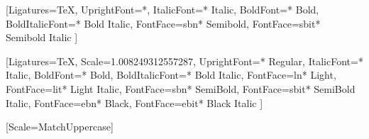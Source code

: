 \usepackage[margin=0.75in]{geometry}

\usepackage{fontspec}
\setmainfont{Arno Pro}
  [Ligatures=TeX,
   UprightFont=*,
   ItalicFont={* Italic},
   BoldFont={* Bold},
   BoldItalicFont={* Bold Italic},
   FontFace={sb}{n}{* Semibold},
   FontFace={sb}{it}{* Semibold Italic}
   ]
\DeclareRobustCommand{\sbseries}{\fontseries{sb}\selectfont}
\DeclareTextFontCommand{\textsb}{\sbseries}

\setsansfont{Source Sans Pro}
  [Ligatures=TeX,
   Scale=1.008249312557287,
   UprightFont={* Regular},
   ItalicFont={* Italic},
   BoldFont={* Bold},
   BoldItalicFont={* Bold Italic},
   FontFace={l}{n}{* Light},
   FontFace={l}{it}{* Light Italic},
   FontFace={sb}{n}{* SemiBold},
   FontFace={sb}{it}{* SemiBold Italic},
   FontFace={eb}{n}{* Black},
   FontFace={eb}{it}{* Black Italic}
  ]
\DeclareRobustCommand{\ltseries}{\fontseries{l}\selectfont}
\DeclareTextFontCommand{\textlt}{\ltseries}
\DeclareRobustCommand{\ebseries}{\fontseries{eb}\selectfont}
\DeclareTextFontCommand{\texteb}{\ebseries}

\setmonofont{IBM Plex Mono Regular}[Scale=MatchUppercase]

\usepackage[dvipsnames]{xcolor}

\usepackage{titling}
\pretitle{\begin{center}\Large\sffamily\bfseries\color{themecolour}}
\posttitle{\par\end{center}\vspace{20ex}}
\preauthor{\begin{center}\vspace{15\baselineskip}\large}
\postauthor{\normalsize\end{center}\vspace{-5ex}}
\predate{\begin{center}\large}
\postdate{\end{center}\normalsize}

